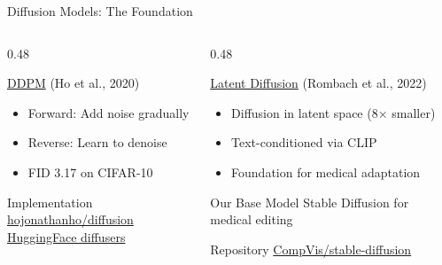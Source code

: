 \documentclass[aspectratio=169,xcolor=dvipsnames]{beamer}
\begin{document}
\begin{frame}{Diffusion Models: The Foundation}
    \begin{columns}
        \begin{column}{0.48\textwidth}
            \begin{block}{\href{https://arxiv.org/abs/2006.11239}{DDPM} (Ho et al., 2020)}
                \small
                \begin{itemize}\setlength{\itemsep}{1pt}
                    \item Forward: Add noise gradually
                    \item Reverse: Learn to denoise
                    \item FID 3.17 on CIFAR-10
                \end{itemize}
            \end{block}
            
            \begin{exampleblock}{ Implementation}
                \scriptsize
                \href{https://github.com/hojonathanho/diffusion}{hojonathanho/diffusion}\\
                \href{https://huggingface.co/docs/diffusers}{HuggingFace diffusers}
            \end{exampleblock}
        \end{column}
        
        \begin{column}{0.48\textwidth}
            \begin{block}{\href{https://arxiv.org/abs/2112.10752}{Latent Diffusion} (Rombach et al., 2022)}
                \small
                \begin{itemize}\setlength{\itemsep}{1pt}
                    \item Diffusion in latent space (8× smaller)
                    \item Text-conditioned via CLIP
                    \item Foundation for medical adaptation
                \end{itemize}
            \end{block}
            
            \begin{alertblock}{ Our Base Model}
                \small Stable Diffusion for medical editing
            \end{alertblock}
            
            \begin{exampleblock}{ Repository}
                \scriptsize
                \href{https://github.com/CompVis/stable-diffusion}{CompVis/stable-diffusion}
            \end{exampleblock}
        \end{column}
    \end{columns}
\end{frame}
\end{document}
